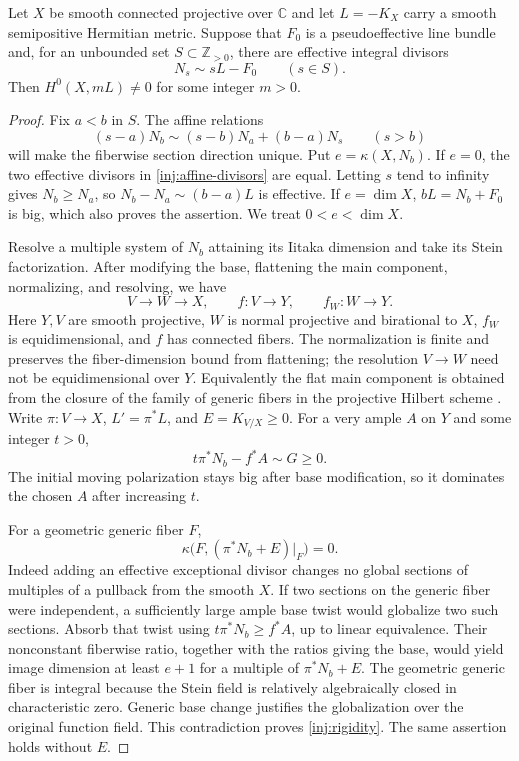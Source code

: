 \begin{proposition}\label{inj:ordinary-conversion}
Let $X$ be smooth connected projective over $\mathbb C$ and let
$L=-K_X$ carry a smooth semipositive Hermitian metric.  Suppose that
$F_0$ is a pseudoeffective line bundle and, for an unbounded set
$S\subset\mathbb Z_{>0}$, there are effective integral divisors
\[
 N_s\sim sL-F_0\qquad(s\in S).
\]
Then $H^0(X,mL)\ne0$ for some integer $m>0$.
\end{proposition}

\begin{proof}
Fix $a<b$ in $S$.  The affine relations
\begin{equation}\label{inj:affine-divisors}
 (s-a)N_b\sim(s-b)N_a+(b-a)N_s\qquad(s>b)
\end{equation}
will make the fiberwise section direction unique.  Put
$e=\kappa(X,N_b)$.  If $e=0$, the two effective divisors in
\eqref{inj:affine-divisors} are equal.  Letting $s$ tend to infinity
gives $N_b\ge N_a$, so $N_b-N_a\sim(b-a)L$ is effective.  If
$e=\dim X$, $bL=N_b+F_0$ is big, which also proves the assertion.
We treat $0<e<\dim X$.

Resolve a multiple system of $N_b$ attaining its Iitaka dimension and
take its Stein factorization.  After modifying the base, flattening
the main component, normalizing, and resolving, we have
\[
 V\longrightarrow W\longrightarrow X,
 \qquad f:V\to Y,
 \qquad f_W:W\to Y.
\]
Here $Y,V$ are smooth projective, $W$ is normal projective and birational
to $X$, $f_W$ is equidimensional, and $f$ has connected fibers.  The
normalization is finite and preserves the fiber-dimension bound from
flattening; the resolution $V\to W$ need not be equidimensional over
$Y$.  Equivalently the flat main component is obtained from the closure
of the family of generic fibers in the projective Hilbert scheme
\cite[Theorem~3.2]{Grothendieck1961Hilbert}.  Write
$\pi:V\to X$, $L'=\pi^*L$, and $E=K_{V/X}\ge0$.
For a very ample $A$ on $Y$ and some integer $t>0$,
\[
 t\pi^*N_b-f^*A\sim G\ge0.
\]
The initial moving polarization stays big after base modification, so
it dominates the chosen $A$ after increasing $t$.

For a geometric generic fiber $F$,
\begin{equation}\label{inj:rigidity}
 \kappa\bigl(F,(\pi^*N_b+E)|_F\bigr)=0.
\end{equation}
Indeed adding an effective exceptional divisor changes no global
sections of multiples of a pullback from the smooth $X$.  If two
sections on the generic fiber were independent, a sufficiently large
ample base twist would globalize two such sections.  Absorb that twist
using $t\pi^*N_b\ge f^*A$, up to linear equivalence.  Their nonconstant
fiberwise ratio, together with the ratios giving the base, would yield
image dimension at least $e+1$ for a multiple of $\pi^*N_b+E$.
The geometric generic fiber is integral because the Stein field is
relatively algebraically closed in characteristic zero.  Generic base
change justifies the globalization over the original function field.
This contradiction proves \eqref{inj:rigidity}.  The same assertion
holds without $E$.


\end{proof}
